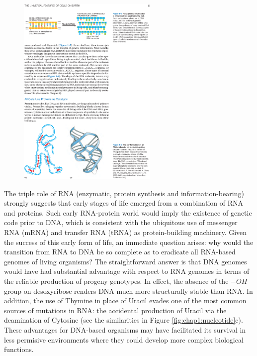 \begin{figure}[h]
	\begin{minipage}[b]{\linewidth}
	  \centering
	  \includegraphics*[width=0.6\textwidth]{figures/chap1_rna_enzyme_full}
	  \caption{}
	  \label{fig:chap1:rna_enzyme}
   \end{minipage}
\end{figure}

The triple role of RNA (enzymatic, protein synthesis and
information-bearing) strongly suggests that early stages of life
emerged from a combination of RNA and proteins. Such early RNA-protein
world would imply the existence of genetic code prior to DNA, which is
consistent with the ubiquitous use of messenger RNA (mRNA) and
transfer RNA (tRNA) as protein-building machinery. Given the success
of this early form of life, an immediate question arises: why would
the transition from RNA to DNA be so complete as to eradicate all
RNA-based genomes of living organisms? The straightforward answer is
that DNA genomes would have had substantial advantage with respect to
RNA genomes in terms of the
reliable production of progeny genotypes. In effect, the absence of
the $-OH$ group on desoxyribose renders DNA much more structurally
stable than RNA. In addition, the use of Thymine in place of Uracil
evades one of the most common sources of mutations in RNA: the accidental
production of Uracil via the deamination of Cytosine (see the
similarities in Figure \ref{fig:chap1:nucleotide}c). These advantages
for DNA-based organisms may have facilitated its survival in less permisive
environments where they could develop more complex biological functions.

